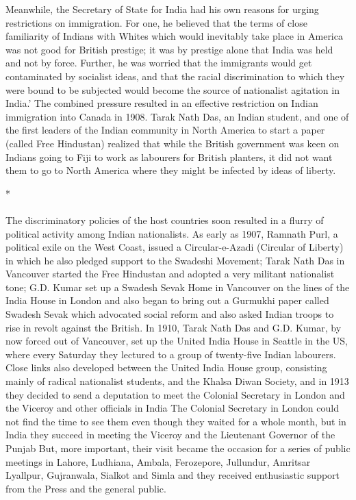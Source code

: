 Meanwhile, the Secretary of State for India had his own reasons for urging restrictions on immigration. For one, he believed that the terms of close familiarity of Indians with Whites which would inevitably take place in America was not good for British prestige; it was by prestige alone that India was held and not by force. Further, he was worried that the immigrants would get contaminated by socialist ideas, and that the racial discrimination to which they were bound to be subjected would become the source of nationalist agitation in India.' The combined pressure resulted in an effective restriction on Indian immigration into Canada in 1908. Tarak Nath Das, an Indian student, and one of the first leaders of the Indian community in North America to start a paper (called Free Hindustan) realized that while the British government was keen on Indians going to Fiji to work as labourers for British planters, it did not want them to go to North America where they might be infected by ideas of liberty.

\begin{center}*\end{center}

\paragraph*{}


The discriminatory policies of the host countries soon resulted in a flurry of political activity among Indian nationalists. As early as 1907, Ramnath Purl, a political exile on the West Coast, issued a Circular-e-Azadi (Circular of Liberty) in which he also pledged support to the Swadeshi Movement; Tarak Nath Das in Vancouver started the Free Hindustan and adopted a very militant nationalist tone; G.D. Kumar set up a Swadesh Sevak Home in Vancouver on the lines of the India House in London and also began to bring out a Gurmukhi paper called Swadesh Sevak which advocated social reform and also asked Indian troops to rise in revolt against the British. In 1910, Tarak Nath Das and G.D. Kumar, by now forced out of Vancouver, set up the United India House in Seattle in the US, where every Saturday they lectured to a group of twenty-five Indian labourers. Close links also developed between the United India House group, consisting mainly of radical nationalist students, and the Khalsa Diwan Society, and in 1913 they decided to send a deputation to meet the Colonial Secretary in London and the Viceroy and other officials in India The Colonial Secretary in London could not find the time to see them even though they waited for a whole month, but in India they succeed in meeting the Viceroy and the Lieutenant Governor of the Punjab But, more important, their visit became the occasion for a series of public meetings in Lahore, Ludhiana, Ambala, Ferozepore, Jullundur, Amritsar Lyallpur, Gujranwala, Sialkot and Simla and they received enthusiastic support from the Press and the general public.

